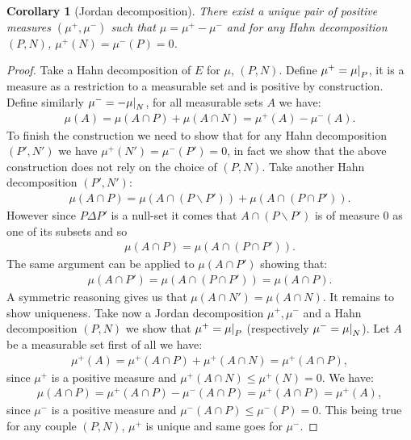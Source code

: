 \documentclass[11pt,a4paper]{article}
\newcommand\restr[2]{{%
  \left.\kern-\nulldelimiterspace %
  #1 %
  \littletaller %
  \right|_{#2} %
  }}
\newcommand{\littletaller}{\mathchoice{\vphantom{\big|}}{}{}{}}
\newtheorem{corollary}[theorem]{Corollary}
\begin{document}
\begin{corollary}[Jordan decomposition]
    There exist a unique pair of positive measures $(\mu^+,\mu^-)$ such that $\mu = \mu^+ - \mu^-$ and for any Hahn decomposition $(P,N)$, $\mu^+(N) = \mu^-(P) = 0$.
\end{corollary}
\begin{proof}
    Take a Hahn decomposition of $E$ for $\mu$, $(P,N)$. Define $\mu^+ = \restr{\mu}{P}$, it is a measure as a restriction to a measurable set and is positive by construction. Define similarly $\mu^-= - \restr{\mu}{N}$, for all measurable sets $A$ we have:
    \begin{align*}
        \mu(A) = \mu(A\cap P) + \mu(A\cap N) =  \mu^+(A) - \mu^-(A).
    \end{align*}
    To finish the construction we need to show that for any Hahn decomposition $(P',N')$ we have $\mu^+(N') = \mu^-(P') = 0$, in fact we show that the above construction does not rely on the choice of $(P,N)$. Take another Hahn decomposition $(P',N')$:
    \begin{align*}
        \mu(A\cap P) = \mu(A\cap (P\backslash P')) + \mu(A\cap (P\cap P')).
    \end{align*}
    However since $P\Delta P'$ is a null-set it comes that $A\cap (P\backslash P')$ is of measure $0$ as one of its subsets and so
    \begin{align*}
        \mu(A\cap P) =\mu(A\cap (P\cap P')).
    \end{align*}
    The same argument can be applied to $\mu(A\cap P')$ showing that:
    \begin{align*}
        \mu(A\cap P') =\mu(A\cap (P\cap P')) = \mu(A\cap P).
    \end{align*}
    A symmetric reasoning gives us that $\mu(A\cap N') = \mu(A\cap N)$. It remains to show uniqueness. Take now a Jordan decomposition $\mu^+,\mu^-$ and a Hahn decomposition $(P,N)$ we show that $\mu^+ = \restr{\mu}{P}$ (respectively $\mu^- = \restr{\mu}{N}$). Let $A$ be a measurable set first of all we have:
    \begin{align*}
        \mu^+(A) = \mu^+(A\cap P) + \mu^+(A\cap N) = \mu^+(A\cap P),
    \end{align*}
    since $\mu^+$ is a positive measure and $\mu^+(A\cap N) \leq \mu^+(N) = 0$. We have:
    \begin{align*}
        \mu(A\cap P) = \mu^+(A\cap P) - \mu^-(A\cap P) = \mu^+(A\cap P)= \mu^+(A), 
    \end{align*}
    since $\mu^-$ is a positive measure and $\mu^-(A\cap P) \leq \mu^-(P) = 0$. This being true for any couple $(P,N)$, $\mu^+$ is unique and same goes for $\mu^-$.
\end{proof}
\end{document}
